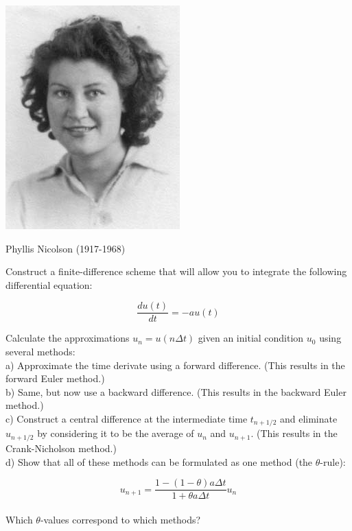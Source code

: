 \begin{marginfigure}[8.5cm]
  \includegraphics{numeric/figures/p_nicolson}
  \caption{Phyllis Nicolson (1917-1968)}
\end{marginfigure}

\begin{exer}
Construct a finite-difference scheme that will allow you to integrate the following differential equation:

$$\frac{du(t)}{dt} = -a u(t)$$

Calculate the approximations $u_n = u(n \Delta t)$ given an initial condition $u_0$ using several methods: \\

a) Approximate the time derivate using a forward difference. (This results in the forward Euler method.) \\

b) Same, but now use a backward difference. (This results in the backward Euler method.)\\

c) Construct a central difference at the intermediate time $t_{n+1/2}$ and eliminate $u_{n+1/2}$ by considering it to be the average of $u_{n}$ and $u_{n+1}$. (This results in the Crank-Nicholson method.) \\

d) Show that all of these methods can be formulated as one method (the $\theta$-rule):

$$u_{n+1} = \frac{1-(1-\theta) a \Delta t}{1+ \theta a \Delta t} u_n$$ \\

Which $\theta$-values correspond to which methods?

\end{exer}

